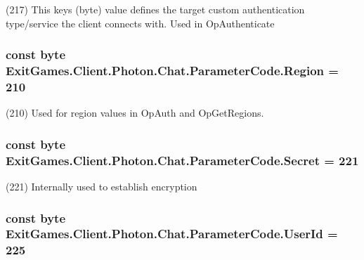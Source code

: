 (217) This key\textquotesingle{}s (byte) value defines the target custom authentication type/service the client connects with. Used in Op\+Authenticate

\subsubsection[{\texorpdfstring{Region}{Region}}]{\setlength{\rightskip}{0pt plus 5cm}const byte Exit\+Games.\+Client.\+Photon.\+Chat.\+Parameter\+Code.\+Region = 210}\hypertarget{class_exit_games_1_1_client_1_1_photon_1_1_chat_1_1_parameter_code_a858cbc8aac0919b92ab761e92decf1da}{}\label{class_exit_games_1_1_client_1_1_photon_1_1_chat_1_1_parameter_code_a858cbc8aac0919b92ab761e92decf1da}


(210) Used for region values in Op\+Auth and Op\+Get\+Regions.

\subsubsection[{\texorpdfstring{Secret}{Secret}}]{\setlength{\rightskip}{0pt plus 5cm}const byte Exit\+Games.\+Client.\+Photon.\+Chat.\+Parameter\+Code.\+Secret = 221}\hypertarget{class_exit_games_1_1_client_1_1_photon_1_1_chat_1_1_parameter_code_a8024f1b6758fb3fa6bcb54581965d7c9}{}\label{class_exit_games_1_1_client_1_1_photon_1_1_chat_1_1_parameter_code_a8024f1b6758fb3fa6bcb54581965d7c9}


(221) Internally used to establish encryption

\subsubsection[{\texorpdfstring{User\+Id}{UserId}}]{\setlength{\rightskip}{0pt plus 5cm}const byte Exit\+Games.\+Client.\+Photon.\+Chat.\+Parameter\+Code.\+User\+Id = 225}\hypertarget{class_exit_games_1_1_client_1_1_photon_1_1_chat_1_1_parameter_code_a2b1f96b419566ad8b1bfc78caf261f76}{}\label{class_exit_games_1_1_client_1_1_photon_1_1_chat_1_1_parameter_code_a2b1f96b419566ad8b1bfc78caf261f76}


